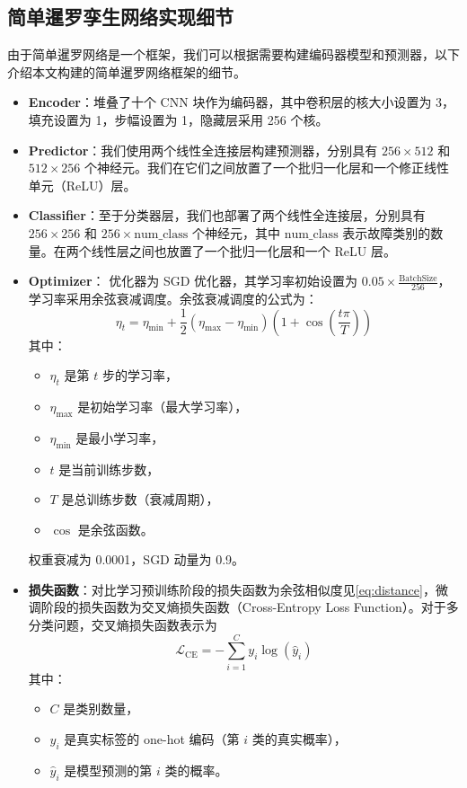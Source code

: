 \documentclass[master]{thesis-uestc}
\begin{document}
\subsection{简单暹罗孪生网络实现细节}
由于简单暹罗网络是一个框架，我们可以根据需要构建编码器模型和预测器，以下介绍本文构建的简单暹罗网络框架的细节。
\begin{itemize}
    \item \textbf{Encoder}：堆叠了十个 CNN 块作为编码器，其中卷积层的核大小设置为 3，填充设置为 1，步幅设置为 1，隐藏层采用 256 个核。
    
    \item \textbf{Predictor}：我们使用两个线性全连接层构建预测器，分别具有 \( 256 \times 512 \) 和 \( 512 \times 256 \) 个神经元。我们在它们之间放置了一个批归一化层和一个修正线性单元（ReLU）层。

    \item \textbf{Classifier}：至于分类器层，我们也部署了两个线性全连接层，分别具有 \( 256 \times 256 \) 和 \( 256 \times \text{num\_class} \) 个神经元，其中 \(\text{num\_class}\) 表示故障类别的数量。在两个线性层之间也放置了一个批归一化层和一个 ReLU 层。

    \item \textbf{Optimizer}：
        优化器为 SGD 优化器，其学习率初始设置为 \( 0.05 \times \frac{\text{BatchSize}}{256} \)，学习率采用余弦衰减调度。余弦衰减调度的公式为：
        \[
        \eta_t = \eta_{\text{min}} + \frac{1}{2} (\eta_{\text{max}} - \eta_{\text{min}}) \left(1 + \cos\left(\frac{t \pi}{T}\right)\right)
        \]
        其中：
        \begin{itemize}
            \item \(\eta_t\) 是第 \(t\) 步的学习率，
            \item \(\eta_{\text{max}}\) 是初始学习率（最大学习率），
            \item \(\eta_{\text{min}}\) 是最小学习率，
            \item \(t\) 是当前训练步数，
            \item \(T\) 是总训练步数（衰减周期），
            \item \(\cos\) 是余弦函数。
        \end{itemize}
        权重衰减为 0.0001，SGD 动量为 0.9。

    \item \textbf{损失函数}：对比学习预训练阶段的损失函数为余弦相似度见\ref{eq:distance}，微调阶段的损失函数为交叉熵损失函数（Cross-Entropy Loss Function）。对于多分类问题，交叉熵损失函数表示为
    \begin{equation}
        \mathcal{L}_{\text{CE}} = -\sum_{i=1}^{C} y_i \log(\hat{y}_i)
        \end{equation}        
        其中：
        \begin{itemize}
            \item \( C \) 是类别数量，
            \item \( y_i \) 是真实标签的 one-hot 编码（第 \( i \) 类的真实概率），
            \item \( \hat{y}_i \) 是模型预测的第 \( i \) 类的概率。
        \end{itemize}


\end{itemize}
\end{document}
